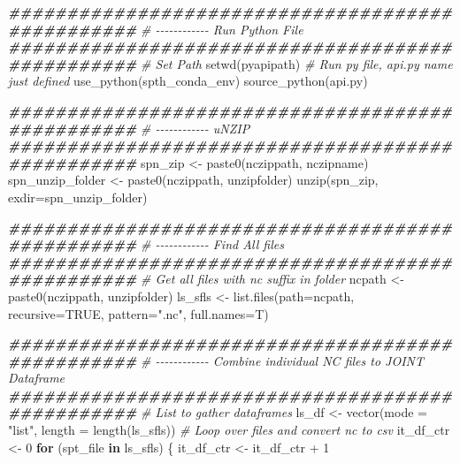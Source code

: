 \documentclass[
]{book}
\newenvironment{Shaded}{\begin{snugshade}}{\end{snugshade}}
\newcommand{\AttributeTok}[1]{\textcolor[rgb]{0.77,0.63,0.00}{#1}}
\newcommand{\CommentTok}[1]{\textcolor[rgb]{0.56,0.35,0.01}{\textit{#1}}}
\newcommand{\ConstantTok}[1]{\textcolor[rgb]{0.00,0.00,0.00}{#1}}
\newcommand{\ControlFlowTok}[1]{\textcolor[rgb]{0.13,0.29,0.53}{\textbf{#1}}}
\newcommand{\DecValTok}[1]{\textcolor[rgb]{0.00,0.00,0.81}{#1}}
\newcommand{\DocumentationTok}[1]{\textcolor[rgb]{0.56,0.35,0.01}{\textbf{\textit{#1}}}}
\newcommand{\FunctionTok}[1]{\textcolor[rgb]{0.00,0.00,0.00}{#1}}
\newcommand{\NormalTok}[1]{#1}
\newcommand{\OtherTok}[1]{\textcolor[rgb]{0.56,0.35,0.01}{#1}}
\newcommand{\SpecialCharTok}[1]{\textcolor[rgb]{0.00,0.00,0.00}{#1}}
\newcommand{\StringTok}[1]{\textcolor[rgb]{0.31,0.60,0.02}{#1}}
\begin{document}
\begin{Shaded}
\begin{Highlighting}[]
    \DocumentationTok{\#\#\#\#\#\#\#\#\#\#\#\#\#\#\#\#\#\#\#\#\#\#\#\#\#\#\#\#\#\#\#\#\#\#\#\#\#\#\#\#\#\#\#\#\#\#\#\#\#}
    \CommentTok{\# {-}{-}{-}{-}{-}{-}{-}{-}{-}{-}{-}{-} Run Python File}
    \DocumentationTok{\#\#\#\#\#\#\#\#\#\#\#\#\#\#\#\#\#\#\#\#\#\#\#\#\#\#\#\#\#\#\#\#\#\#\#\#\#\#\#\#\#\#\#\#\#\#\#\#\#}
    \CommentTok{\# Set Path}
    \FunctionTok{setwd}\NormalTok{(pyapipath)}
    \CommentTok{\# Run py file, api.py name just defined}
    \FunctionTok{use\_python}\NormalTok{(spth\_conda\_env)}
    \FunctionTok{source\_python}\NormalTok{(}\StringTok{\textquotesingle{}api.py\textquotesingle{}}\NormalTok{)}

    \DocumentationTok{\#\#\#\#\#\#\#\#\#\#\#\#\#\#\#\#\#\#\#\#\#\#\#\#\#\#\#\#\#\#\#\#\#\#\#\#\#\#\#\#\#\#\#\#\#\#\#\#\#}
    \CommentTok{\# {-}{-}{-}{-}{-}{-}{-}{-}{-}{-}{-}{-} uNZIP}
    \DocumentationTok{\#\#\#\#\#\#\#\#\#\#\#\#\#\#\#\#\#\#\#\#\#\#\#\#\#\#\#\#\#\#\#\#\#\#\#\#\#\#\#\#\#\#\#\#\#\#\#\#\#}
\NormalTok{    spn\_zip }\OtherTok{\textless{}{-}} \FunctionTok{paste0}\NormalTok{(nczippath, nczipname)}
\NormalTok{    spn\_unzip\_folder }\OtherTok{\textless{}{-}} \FunctionTok{paste0}\NormalTok{(nczippath, unzipfolder)}
    \FunctionTok{unzip}\NormalTok{(spn\_zip, }\AttributeTok{exdir=}\NormalTok{spn\_unzip\_folder)}

    \DocumentationTok{\#\#\#\#\#\#\#\#\#\#\#\#\#\#\#\#\#\#\#\#\#\#\#\#\#\#\#\#\#\#\#\#\#\#\#\#\#\#\#\#\#\#\#\#\#\#\#\#\#}
    \CommentTok{\# {-}{-}{-}{-}{-}{-}{-}{-}{-}{-}{-}{-} Find All files}
    \DocumentationTok{\#\#\#\#\#\#\#\#\#\#\#\#\#\#\#\#\#\#\#\#\#\#\#\#\#\#\#\#\#\#\#\#\#\#\#\#\#\#\#\#\#\#\#\#\#\#\#\#\#}
    \CommentTok{\# Get all files with nc suffix in folder}
\NormalTok{    ncpath }\OtherTok{\textless{}{-}} \FunctionTok{paste0}\NormalTok{(nczippath, unzipfolder)}
\NormalTok{    ls\_sfls }\OtherTok{\textless{}{-}} \FunctionTok{list.files}\NormalTok{(}\AttributeTok{path=}\NormalTok{ncpath, }\AttributeTok{recursive=}\ConstantTok{TRUE}\NormalTok{, }\AttributeTok{pattern=}\StringTok{".nc"}\NormalTok{, }\AttributeTok{full.names=}\NormalTok{T)}

    \DocumentationTok{\#\#\#\#\#\#\#\#\#\#\#\#\#\#\#\#\#\#\#\#\#\#\#\#\#\#\#\#\#\#\#\#\#\#\#\#\#\#\#\#\#\#\#\#\#\#\#\#\#}
    \CommentTok{\# {-}{-}{-}{-}{-}{-}{-}{-}{-}{-}{-}{-} Combine individual NC files to JOINT Dataframe}
    \DocumentationTok{\#\#\#\#\#\#\#\#\#\#\#\#\#\#\#\#\#\#\#\#\#\#\#\#\#\#\#\#\#\#\#\#\#\#\#\#\#\#\#\#\#\#\#\#\#\#\#\#\#}
    \CommentTok{\# List to gather dataframes}
\NormalTok{    ls\_df }\OtherTok{\textless{}{-}} \FunctionTok{vector}\NormalTok{(}\AttributeTok{mode =} \StringTok{"list"}\NormalTok{, }\AttributeTok{length =} \FunctionTok{length}\NormalTok{(ls\_sfls))}
    \CommentTok{\# Loop over files and convert nc to csv}
\NormalTok{    it\_df\_ctr }\OtherTok{\textless{}{-}} \DecValTok{0}
    \ControlFlowTok{for}\NormalTok{ (spt\_file }\ControlFlowTok{in}\NormalTok{ ls\_sfls) \{}
\NormalTok{      it\_df\_ctr }\OtherTok{\textless{}{-}}\NormalTok{ it\_df\_ctr }\SpecialCharTok{+} \DecValTok{1}


\end{Highlighting}
\end{Shaded}
\end{document}
